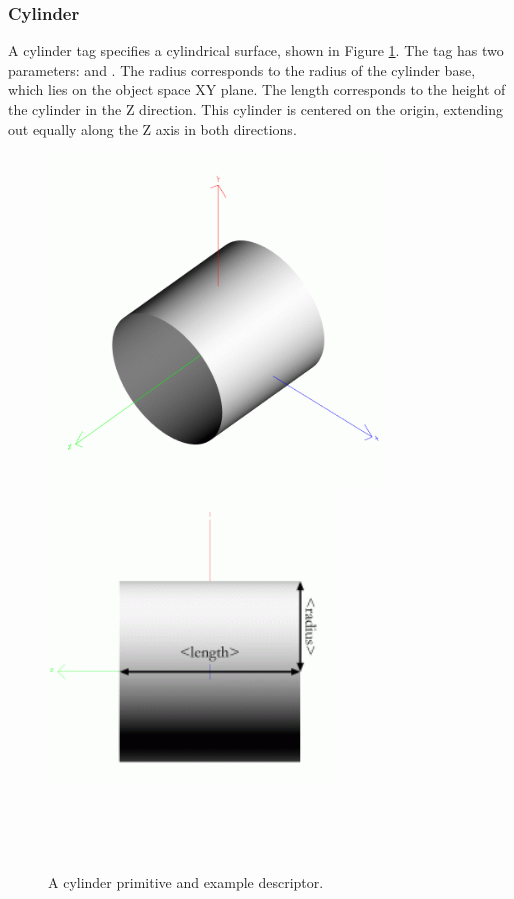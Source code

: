\subsubsection{Cylinder}
A cylinder tag specifies a cylindrical surface, shown in Figure \ref{fig:CylPrimitive}.  The tag has two parameters:  and .
The radius corresponds to the radius of the cylinder base, which lies on the object space XY plane.
The length corresponds to the height of the cylinder in the Z direction.
This cylinder is centered on the origin, extending out equally along the Z axis in both directions.
\begin{figure}
 \begin{center}
   \includegraphics[width=3.5in]{pics/cylinder.png} \\
   \includegraphics[width=3in]{pics/cyl-measure.png} \\
 \end{center}           
 \noindent
        \hspace*{2in}   \\
        \hspace*{2.2in} \\
        \hspace*{2.2in} \\
  \hspace*{2in}   
    
        \caption[A cylinder primitive]{A cylinder primitive and example descriptor.}
        \label{fig:CylPrimitive}
\end{figure}



